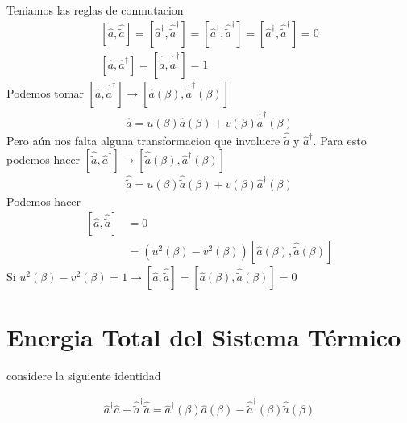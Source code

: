 \documentclass{article}
\newcommand{\caja}[3]{%
  \begin{tcolorbox}[colback=#1!5!white,colframe=#1!25!black,title=#2]
    #3
  \end{tcolorbox}%
}
\begin{document}
Teniamos las reglas de conmutacion 
\begin{gather*}
  \left[ \hat a  , \hat{\tilde a }  \right] = \left[ \hat a ^ {\dagger } , \hat{\tilde a }^ {\dagger }  \right] = \left[ \hat a ^ {\dagger } , \hat{\tilde a } ^ {\dagger }  \right] = \left[ \hat a ^ {\dagger } , \hat{\tilde a } ^ {\dagger }  \right] = 0\\
  \left[ \hat{ a } , \hat{ a }^ {\dagger }  \right] = \left[ \hat{\tilde a } , \hat{\tilde a }^ {\dagger }  \right] = 1
\end{gather*}
Podemos tomar $ \left[ \hat a  ,  \hat{\tilde a } ^ {\dagger }  \right] \rightarrow  \left[ \hat a(\beta)  ,  \hat{\tilde a } ^ {\dagger }(\beta)  \right]$
\begin{gather*}
  \hat a = u(\beta) \hat a (\beta) + v (\beta) \hat{\tilde a}^ {\dagger }(\beta) 
\end{gather*}
Pero aún nos falta alguna transformacion que involucre $ \hat{\tilde a } $ y $ \hat a ^ {\dagger } $. Para esto podemos hacer $ \left[ \hat{\tilde a } , \hat a ^ {\dagger }  \right] \rightarrow \left[ \hat{\tilde a }(\beta) , \hat a ^ {\dagger }(\beta)  \right] $
\begin{gather*}
  \hat{\tilde a} = u(\beta) \hat{ \tilde a }(\beta) + v (\beta) \hat{ a}^ {\dagger }(\beta) 
\end{gather*}
Podemos hacer 
\begin{align*}
  \left[ \hat a  , \hat{\tilde a }  \right] &= 0 \\
      &= (u ^2(\beta) - v^2(\beta)) \left[\hat a (\beta), \hat{\tilde a }(\beta)\right]
\end{align*}
Si $ u ^2(\beta) - v ^2(\beta) = 1 \rightarrow \left[\hat a , \hat{\tilde a }\right]=\left[\hat a (\beta), \hat{\tilde a }(\beta)\right]=0 $



\section{Energia Total del Sistema Térmico}
considere la siguiente identidad 
\caja{green}{}{
  \begin{gather*}
    \hat a ^ {\dagger } \hat a - \hat{\tilde a } ^ {\dagger } \hat{\tilde a } = \hat a ^ {\dagger }(\beta) \hat a(\beta) - \hat{\tilde a } ^ {\dagger }(\beta) \hat{\tilde a }(\beta) 
  \end{gather*}
}
\end{document}
